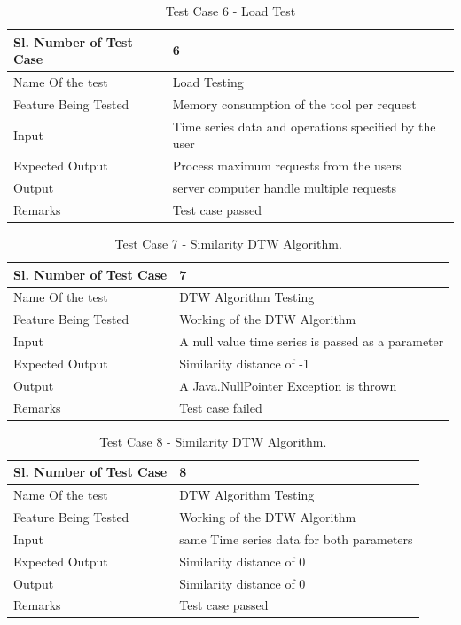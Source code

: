 \documentclass[12pt,a4paper]{report}
\begin{document}
\begin{table}
    \begin{tabular}{|l|l|}
    \hline
    Sl. Number of Test Case & 6                             \\ \hline
    Name Of the test        & Load Testing               \\ \hline
    Feature Being Tested    & Memory consumption of the tool per request\\ \hline
    Input                   & Time series data and operations specified by the user  \\ \hline
    Expected Output         & Process maximum requests from the users \\ \hline
    Output                  & server computer handle multiple requests \\ \hline
    Remarks                 & Test case passed              \\ \hline
    \end{tabular}
    \caption {Test Case 6 - Load Test}
\end{table}

\begin{table}
    \begin{tabular}{|l|l|}
    \hline
    Sl. Number of Test Case & 7                             \\ \hline
    Name Of the test        & DTW Algorithm Testing        \\ \hline
    Feature Being Tested    & Working of the DTW Algorithm \\ \hline
    Input                   & A null value time series is passed as a parameter\\ \hline
    Expected Output         & Similarity distance of -1 \\ \hline
    Output                  & A Java.NullPointer Exception is thrown \\ \hline
    Remarks                 & Test case failed              \\ \hline
    \end{tabular}
    \caption {Test Case 7 - Similarity DTW Algorithm.}
\end{table}
\begin{table}
    \begin{tabular}{|l|l|}
    \hline
    Sl. Number of Test Case & 8                            \\ \hline
    Name Of the test        & DTW Algorithm Testing        \\ \hline
    Feature Being Tested    & Working of the DTW Algorithm \\ \hline
    Input                   & same Time series data for both parameters\\ \hline
    Expected Output         & Similarity distance of 0 \\ \hline
    Output                  & Similarity distance of 0 \\ \hline
    Remarks                 & Test case passed              \\ \hline
    \end{tabular}
    \caption {Test Case 8 - Similarity DTW Algorithm.}
\end{table}
\end{document}
